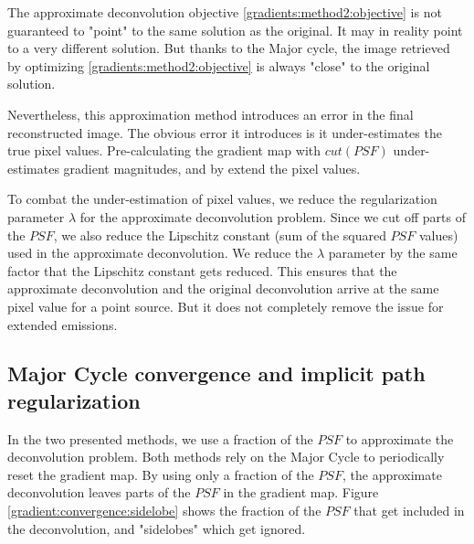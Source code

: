 The approximate deconvolution objective \eqref{gradients:method2:objective} is not guaranteed to "point" to the same solution as the original. It may in reality point to a very different solution. But thanks to the Major cycle, the image retrieved by optimizing \eqref{gradients:method2:objective} is always "close" to the original solution.

Nevertheless, this approximation method introduces an error in the final reconstructed image. The obvious error it introduces is it under-estimates the true pixel values. Pre-calculating the gradient map with $cut(PSF)$ under-estimates gradient magnitudes, and by extend the pixel values.

To combat the under-estimation of pixel values, we reduce the regularization parameter $\lambda$ for the approximate deconvolution problem. Since we cut off parts of the $PSF$, we also reduce the Lipschitz constant (sum of the squared $PSF$ values) used in the approximate deconvolution. We reduce the $\lambda$ parameter by the same factor that the Lipschitz constant gets reduced. This ensures that the approximate deconvolution and the original deconvolution arrive at the same pixel value for a point source. But it does not completely remove the issue for extended emissions.

\subsection{Major Cycle convergence and implicit path regularization}\label{gradients:pathreg}
In the two presented methods, we use a fraction of the $PSF$ to approximate the deconvolution problem. Both methods rely on the Major Cycle to periodically reset the gradient map. By using only a fraction of the $PSF$, the approximate deconvolution leaves parts of the $PSF$ in the gradient map. Figure \ref{gradient:convergence:sidelobe} shows the fraction of the $PSF$ that get included in the deconvolution, and "sidelobes" which get ignored.


